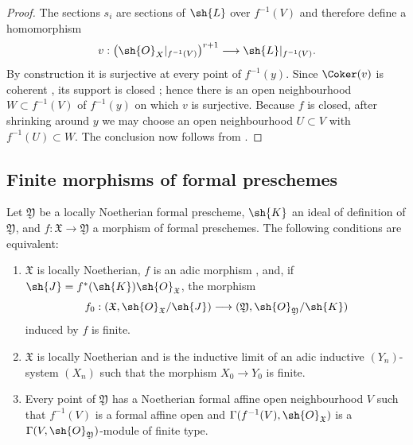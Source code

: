 \begin{proof}
The sections $s_i$ are sections of $\sh{L}$ over $f^{-1}(V)$ and
therefore define a homomorphism
\[
  v:
  \bigl(\sh{O}_X|_{f^{-1}(V)}\bigr)^{r+1}
  \longrightarrow
  \sh{L}|_{f^{-1}(V)}.
\]
By construction it is surjective at every point of $f^{-1}(y)$.
Since $\Coker(v)$ is coherent , its support is
closed ; hence there is an open neighbourhood
$W\subset f^{-1}(V)$ of $f^{-1}(y)$ on which $v$ is surjective.
Because $f$ is closed, after shrinking around $y$ we may choose an
open neighbourhood $U\subset V$ with $f^{-1}(U)\subset W$.
The conclusion now follows from .
\end{proof}


\subsection{Finite morphisms of formal preschemes}
\label{subsection:III.4.8}

\begin{proposition}[4.8.1]
\label{III.4.8.1}
Let $\mathfrak{Y}$ be a locally Noetherian formal prescheme,
$\sh{K}$ an ideal of definition of $\mathfrak{Y}$, and
$f:\mathfrak{X}\to\mathfrak{Y}$ a morphism of formal preschemes.
The following conditions are equivalent:
\begin{enumerate}
  \item[\rm{a)}] $\mathfrak{X}$ is locally Noetherian, $f$ is an
    adic morphism , and, if
    $\sh{J}=f^*(\sh{K})\sh{O}_{\mathfrak{X}}$, the morphism
    \[
      f_0:
      (\mathfrak{X},\sh{O}_{\mathfrak{X}}/\sh{J})
      \longrightarrow
      (\mathfrak{Y},\sh{O}_{\mathfrak{Y}}/\sh{K})
    \]
    induced by $f$ is finite.
  \item[\rm{b)}] $\mathfrak{X}$ is locally Noetherian and is the
    inductive limit of an adic inductive $(Y_n)$-system $(X_n)$
    such that the morphism $X_0\to Y_0$ is finite.
  \item[\rm{c)}] Every point of $\mathfrak{Y}$ has a Noetherian
    formal affine open neighbourhood $V$ such that $f^{-1}(V)$ is
    a formal affine open and
    $\Gamma(f^{-1}(V),\sh{O}_{\mathfrak{X}})$ is a
    $\Gamma(V,\sh{O}_{\mathfrak{Y}})$-module of finite type.
\end{enumerate}
\end{proposition}

